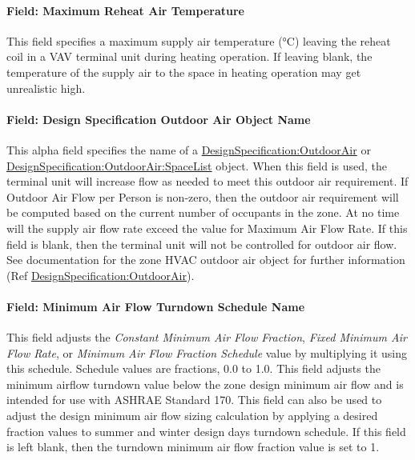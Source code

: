 \paragraph{Field: Maximum Reheat Air Temperature}\label{field-maximum-reheat-air-temperature-1}

This field specifies a maximum supply air temperature (°C) leaving the reheat coil in a VAV terminal unit during heating operation. If leaving blank, the temperature of the supply air to the space in heating operation may get unrealistic high.

\paragraph{Field: Design Specification Outdoor Air Object Name}\label{field-design-specification-outdoor-air-object-name}

This alpha field specifies the name of a \hyperref[designspecificationoutdoorair]{DesignSpecification:OutdoorAir} or \hyperref[designspecificationoutdoorairspacelist]{DesignSpecification:OutdoorAir:SpaceList} object. When this field is used, the terminal unit will increase flow as needed to meet this outdoor air requirement. If Outdoor Air Flow per Person is non-zero, then the outdoor air requirement will be computed based on the current number of occupants in the zone. At no time will the supply air flow rate exceed the value for Maximum Air Flow Rate. If this field is blank, then the terminal unit will not be controlled for outdoor air flow. See documentation for the zone HVAC outdoor air object for further information (Ref \hyperref[designspecificationoutdoorair]{DesignSpecification:OutdoorAir}).

\paragraph{Field: Minimum Air Flow Turndown Schedule Name}

This field adjusts the \textit{Constant Minimum Air Flow Fraction}, \textit{Fixed Minimum Air Flow Rate}, or \textit{Minimum Air Flow Fraction Schedule} value by multiplying it using this schedule. Schedule values are fractions, 0.0 to 1.0. This field adjusts the minimum airflow turndown value below the zone design minimum air flow and is intended for use with ASHRAE Standard 170. This field can also be used to adjust the design minimum air flow sizing calculation by applying a desired fraction values to summer and winter design days turndown schedule. If this field is left blank, then the turndown minimum air flow fraction value is set to 1.

